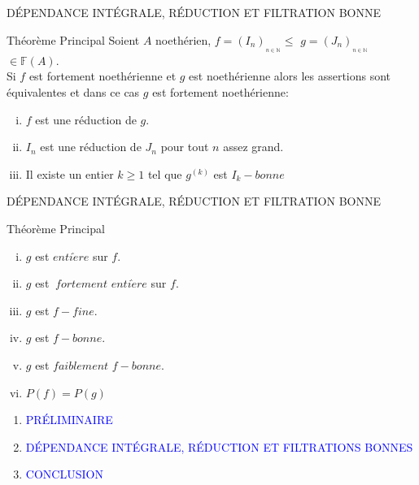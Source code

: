 \documentclass[11pt,a4paper]{beamer}
\begin{document}
	\begin{frame}{DÉPENDANCE INTÉGRALE, RÉDUCTION ET FILTRATION BONNE}
		\begin{block}{Théorème Principal}
			Soient $A$ noethérien, $f=(I_{n})_{_{n\in \mathbb{N}}}\leq $ $g=(J_{n})_{_{n\in \mathbb{N}}}$ $ \in \mathbb{F}(A).$ \\ Si $f$ est fortement noethérienne et $g$ est noethérienne alors les assertions sont équivalentes et dans ce cas $g$ est fortement noethérienne:
			\begin{enumerate}[(i)]
				\item $f$ est une réduction de $g.$
				\item $I_{n}$ est une réduction de $J_{n}$ pour tout $n$ assez grand.
				\item Il existe un entier $k\geq 1$ tel que $g^{(k)}$ est $I_{k}-bonne$
			\end{enumerate}
		\end{block}
	\end{frame}
	
	\begin{frame}{DÉPENDANCE INTÉGRALE, RÉDUCTION ET FILTRATION BONNE}
		\begin{block}{Théorème Principal}
			\begin{enumerate}[(iv)]
				\item $g$ est $enti\grave{e}re$ sur $f.$
				\item $g$ est $\ fortement$ $enti\grave{e}re$ sur $f.$
				\item $g$ est $f-fine.$
				\item $g$ est $f-bonne.$
				\item $g$ est $faiblement$ $f-bonne.$
				\item $P(f)=P(g)$
			\end{enumerate}
		\end{block}
	\end{frame}
	
	\begin{frame}
		\begin{enumerate}
			\item<0> \textcolor{blue}{PRÉLIMINAIRE}\\
			\item<0> \textcolor{blue}{DÉPENDANCE INTÉGRALE, RÉDUCTION ET FILTRATIONS BONNES }\\
			\item<1> \textcolor{blue}{CONCLUSION}\\
		\end{enumerate}
	\end{frame}
	
\end{document}
